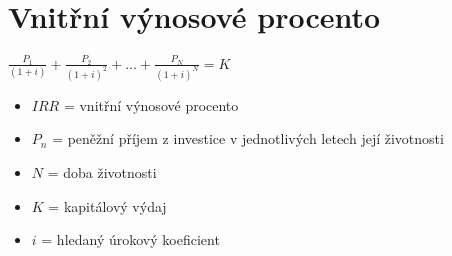 \documentclass[12pt, aspectratio=169]{beamer} %
\begin{document}
\section{Vnitřní výnosové procento}

\begin{frame}{\insertsection}

    \begin{center}
         $\frac{P_1}{(1+i)} + \frac{P_2}{(1+i)^2} + \ldots + \frac{P_N}{(1+i)^N} = K$
    \end{center}
    
    \vspace{10pt}

    \begin{itemize}
        \item $IRR$ = vnitřní výnosové procento
        \item $P_n$ = peněžní příjem z investice v jednotlivých letech její životnosti
        \item $N$ = doba životnosti
        \item $K$ = kapitálový výdaj
        \item $i$ = hledaný úrokový koeficient
    \end{itemize}

\end{frame}
\end{document}
